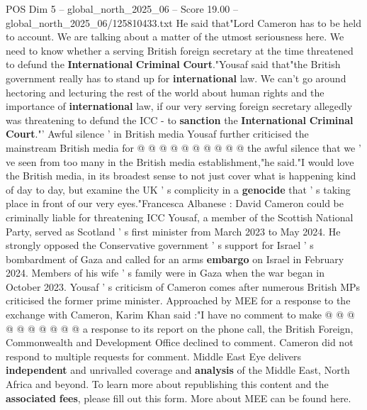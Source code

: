 \begin{textsample}{POS Dim 5 – global\_north\_2025\_06 – Score 19.00 – global\_north\_2025\_06/125810433.txt}
He said that"Lord Cameron has to be held to account.
We are talking about a matter of the utmost seriousness here.
We need to know whether a serving British foreign secretary at the time threatened to defund the \textbf{International} \textbf{Criminal} \textbf{Court}."Yousaf said that"the British government really has to stand up for \textbf{international} law.
We can't go around hectoring and lecturing the rest of the world about human rights and the importance of \textbf{international} law, if our very serving foreign secretary allegedly was threatening to defund the ICC - to \textbf{sanction} the \textbf{International} \textbf{Criminal} \textbf{Court}."' Awful silence ' in British media Yousaf further criticised the mainstream British media for @ @ @ @ @ @ @ @ @ @ the awful silence that we ' ve seen from too many in the British media establishment,"he said."I would love the British media, in its broadest sense to not just cover what is happening kind of day to day, but examine the UK ' s complicity in a \textbf{genocide} that ' s taking place in front of our very eyes."Francesca Albanese : David Cameron could be criminally liable for threatening ICC Yousaf, a member of the Scottish National Party, served as Scotland ' s first minister from March 2023 to May 2024.
He strongly opposed the Conservative government ' s support for Israel ' s bombardment of Gaza and called for an arms \textbf{embargo} on Israel in February 2024.
Members of his wife ' s family were in Gaza when the war began in October 2023.
Yousaf ' s criticism of Cameron comes after numerous British MPs criticised the former prime minister.
Approached by MEE for a response to the exchange with Cameron, Karim Khan said :"I have no comment to make @ @ @ @ @ @ @ @ @ @ a response to its report on the phone call, the British Foreign, Commonwealth and Development Office declined to comment.
Cameron did not respond to multiple requests for comment.
Middle East Eye delivers \textbf{independent} and unrivalled coverage and \textbf{analysis} of the Middle East, North Africa and beyond.
To learn more about republishing this content and the \textbf{associated} \textbf{fees}, please fill out this form.
More about MEE can be found here.

\end{textsample}
